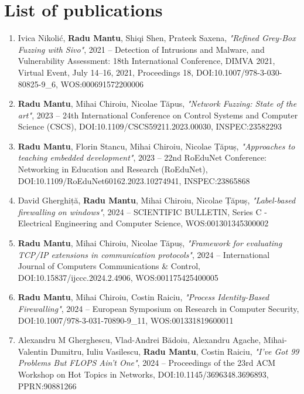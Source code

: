 
\section{List of publications}
\label{conclusion:publications}
{

\begin{enumerate}
    \item Ivica Nikolić, \textbf{Radu Mantu}, Shiqi Shen, Prateek Saxena,
          \textit{"Refined Grey-Box Fuzzing with Sivo"},
          2021 -- Detection of Intrusions and Malware, and Vulnerability
          Assessment: 18th International Conference, DIMVA 2021, Virtual
          Event, July 14–16, 2021, Proceedings 18,
          DOI:10.1007/978-3-030-80825-9\_6, WOS:000691572200006

    \item \textbf{Radu Mantu}, Mihai Chiroiu, Nicolae Tăpus,
          \textit{"Network Fuzzing: State of the art"},
          2023 -- 24th International Conference on Control Systems and Computer
          Science (CSCS),
          DOI:10.1109/CSCS59211.2023.00030, INSPEC:23582293

    \item \textbf{Radu Mantu}, Florin Stancu, Mihai Chiroiu, Nicolae Țăpuș,
          \textit{"Approaches to teaching embedded development"},
          2023 -- 22nd RoEduNet Conference: Networking in Education and Research
          (RoEduNet),
          DOI:10.1109/RoEduNet60162.2023.10274941, INSPEC:23865868

    \item David Gherghiță, \textbf{Radu Mantu}, Mihai Chiroiu, Nicolae Țăpuș,
          \textit{"Label-based firewalling on windows"},
          2024 -- SCIENTIFIC BULLETIN, Series C - Electrical Engineering and
          Computer Science,
          WOS:001301345300002

    \item \textbf{Radu Mantu}, Mihai Chiroiu, Nicolae Tăpuș,
          \textit{"Framework for evaluating TCP/IP extensions in communication
          protocols"},
          2024 -- International Journal of Computers Communications \& Control,
          DOI:10.15837/ijccc.2024.2.4906, WOS:001175425400005

    \item \textbf{Radu Mantu}, Mihai Chiroiu, Costin Raiciu,
          \textit{"Process Identity-Based Firewalling"},
          2024 -- European Symposium on Research in Computer Security,
          DOI:10.1007/978-3-031-70890-9\_11, WOS:001331819600011

    \item Alexandru M Gherghescu, Vlad-Andrei Bădoiu, Alexandru Agache,
          Mihai-Valentin Dumitru, Iuliu Vasilescu, \textbf{Radu Mantu}, Costin
          Raiciu,
          \textit{"I've Got 99 Problems But FLOPS Ain't One"},
          2024 -- Proceedings of the 23rd ACM Workshop on Hot Topics in
          Networks,
          DOI:10.1145/3696348.3696893, PPRN:90881266

\end{enumerate}
}

